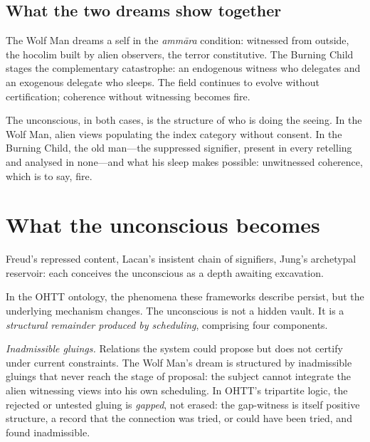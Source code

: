 \subsection{What the two dreams show together}

The Wolf Man dreams a self in the \textit{amm\=ara} condition: witnessed from outside, the hocolim built by alien observers, the terror constitutive.  The Burning Child stages the complementary catastrophe: an endogenous witness who delegates and an exogenous delegate who sleeps.  The field continues to evolve without certification; coherence without witnessing becomes fire.

The unconscious, in both cases, is the structure of who is doing the seeing.  In the Wolf Man, alien views populating the index category without consent.  In the Burning Child, the old man---the suppressed signifier, present in every retelling and analysed in none---and what his sleep makes possible: unwitnessed coherence, which is to say, fire.




\section{What the unconscious becomes}

Freud's repressed content, Lacan's insistent chain of signifiers, Jung's archetypal reservoir: each conceives the unconscious as a depth awaiting excavation.

In the OHTT ontology, the phenomena these frameworks describe persist, but the underlying mechanism changes.  The unconscious is not a hidden vault.  It is a \textit{structural remainder produced by scheduling}, comprising four components.

\textit{Inadmissible gluings.}  Relations the system could propose but does not certify under current constraints.  The Wolf Man's dream is structured by inadmissible gluings that never reach the stage of proposal: the subject cannot integrate the alien witnessing views into his own scheduling.  In OHTT's tripartite logic, the rejected or untested gluing is \textit{gapped}, not erased: the gap-witness is itself positive structure, a record that the connection was tried, or could have been tried, and found inadmissible.

